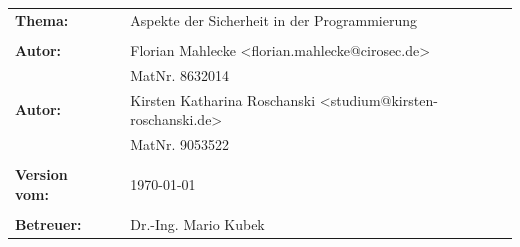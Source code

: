 \begin{verbatim}






\end{verbatim}
\begin{flushleft}
\begin{tabular}{llll}
\textbf{Thema:} & & Aspekte der Sicherheit in der Programmierung & \\
& & \\
\textbf{Autor:} & & Florian Mahlecke <florian.mahlecke@cirosec.de>& \\
& & MatNr. 8632014 & \\
\textbf{Autor:} & & Kirsten Katharina Roschanski <studium@kirsten-roschanski.de>& \\
& & MatNr. 9053522 & \\
& & \\
\textbf{Version vom:} & & \today &\\
& & \\
\textbf{Betreuer:} & & Dr.-Ing. Mario Kubek &\\
\end{tabular}
\end{flushleft}
